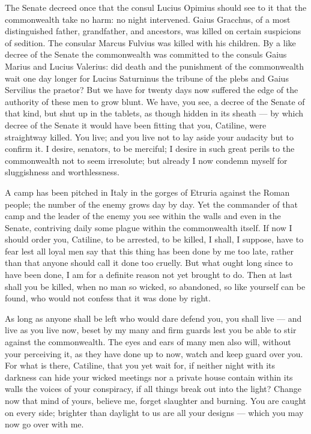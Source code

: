  The Senate decreed once that the consul Lucius Opimius should see to it that the commonwealth take no harm: no night intervened. Gaius Gracchus, of a most distinguished father, grandfather, and ancestors, was killed on certain suspicions of sedition. The consular Marcus Fulvius was killed with his children. By a like decree of the Senate the commonwealth was committed to the consuls Gaius Marius and Lucius Valerius: did death and the punishment of the commonwealth wait one day longer for Lucius Saturninus the tribune of the plebs and Gaius Servilius the praetor? But we have for twenty days now suffered the edge of the authority of these men to grow blunt. We have, you see, a decree of the Senate of that kind, but shut up in the tablets, as though hidden in its sheath --- by which decree of the Senate it would have been fitting that you, Catiline, were straightway killed. You live; and you live not to lay aside your audacity but to confirm it. I desire, senators, to be merciful; I desire in such great perils to the commonwealth not to seem irresolute; but already I now condemn myself for sluggishness and worthlessness.

 A camp has been pitched in Italy in the gorges of Etruria against the Roman people; the number of the enemy grows day by day. Yet the commander of that camp and the leader of the enemy you see within the walls and even in the Senate, contriving daily some plague within the commonwealth itself. If now I should order you, Catiline, to be arrested, to be killed, I shall, I suppose, have to fear lest all loyal men say that this thing has been done by me too late, rather than that anyone should call it done too cruelly. But what ought long since to have been done, I am for a definite reason not yet brought to do. Then at last shall you be killed, when no man so wicked, so abandoned, so like yourself can be found, who would not confess that it was done by right.

 As long as anyone shall be left who would dare defend you, you shall live --- and live as you live now, beset by my many and firm guards lest you be able to stir against the commonwealth. The eyes and ears of many men also will, without your perceiving it, as they have done up to now, watch and keep guard over you. For what is there, Catiline, that you yet wait for, if neither night with its darkness can hide your wicked meetings nor a private house contain within its walls the voices of your conspiracy, if all things break out into the light? Change now that mind of yours, believe me, forget slaughter and burning. You are caught on every side; brighter than daylight to us are all your designs --- which you may now go over with me.

